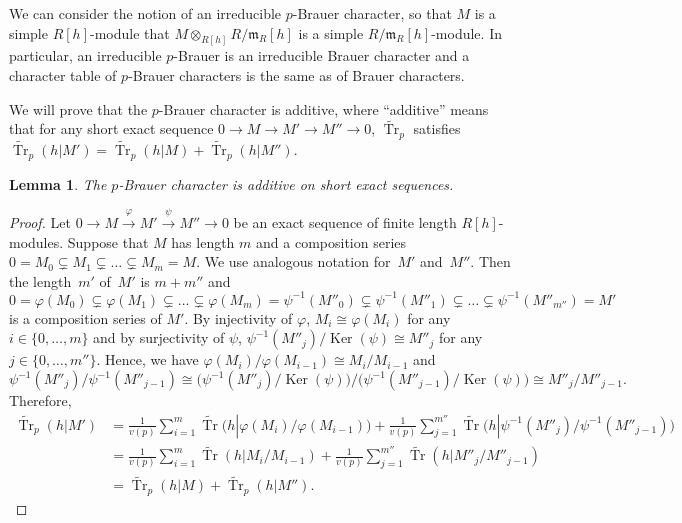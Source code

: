 \documentclass[pdftex]{sigma}%
\numberwithin{equation}{section}
\newtheorem{Lemma}[Theorem]{Lemma}
\begin{document}
We can consider the notion of an irreducible $p$-Brauer character, so that $M$ is a simple $R[h]$-module that $M\otimes_{R[h]} R/\mathfrak{m}_R[h]$ is a simple $R/\mathfrak{m}_R[h]$-module. In particular, an irreducible $p$-Brauer is an irreducible Brauer character and a character table of $p$-Brauer characters is the same as of Brauer characters.

We will prove that the $p$-Brauer character is additive, where ``additive'' means that for any short exact sequence $0\rightarrow M\rightarrow M'\rightarrow M''\rightarrow 0$, $\widetilde{\operatorname{Tr}}_p$ satisfies $\widetilde{\operatorname{Tr}}_p(h|M')=\widetilde{\operatorname{Tr}}_p(h|M)+\widetilde{\operatorname{Tr}}_p(h|M'')$.

\begin{Lemma}\label{additive}
The $p$-Brauer character is additive on short exact sequences.
\end{Lemma}

\begin{proof}
Let $0\rightarrow M\xrightarrow{\varphi} M'\xrightarrow{\psi} M''\rightarrow 0$ be an exact sequence of finite length $R[h]$-modules. Suppose that $M$ has length $m$ and a composition series $0=M_0\subsetneq M_1\subsetneq \dots \subsetneq M_m=M$. We use analogous notation for~$M'$ and~$M''$. Then the length~$m'$ of~$M'$ is $m+m''$ and
\[
0=\varphi(M_0)\subsetneq \varphi(M_1)\subsetneq \dots \subsetneq \varphi(M_m)=\psi^{-1}(M''_0)\subsetneq \psi^{-1}(M''_1)\subsetneq \dots \subsetneq \psi^{-1}(M''_{m''})=M'
\]
 is a composition series of $M'$. By injectivity of $\varphi$, $M_i\cong \varphi(M_i)$ for any $i \in \{0, \dots,m\}$ and by surjectivity of $\psi$, $\psi^{-1}(M''_j)/\operatorname{Ker}(\psi)\cong M''_j$ for any $j \in \{0, \dots,m''\}$. Hence, we have $\varphi(M_i)/\varphi(M_{i-1})\cong M_i/M_{i-1}$ and
\[
\psi^{-1}(M''_j)/\psi^{-1}(M''_{j-1})\cong \big(\psi^{-1}(M''_j)/\operatorname{Ker}(\psi)\big)/\big(\psi^{-1}(M''_{j-1})/\operatorname{Ker}(\psi)\big) \cong M''_j/M''_{j-1}.
\]
 Therefore,
\begin{align*}
\widetilde{\operatorname{Tr}}_p(h|M')&=\frac{1}{v(p)}\sum_{i=1}^m\widetilde{\operatorname{Tr}}\big(h|\varphi(M_i)/\varphi(M_{i-1})\big) +\frac{1}{v(p)}\sum_{j=1}^{m''}\widetilde{\operatorname{Tr}}\big(h|\psi^{-1}(M''_j)/\psi^{-1}(M''_{j-1})\big) \\
 &=\frac{1}{v(p)}\sum_{i=1}^m\widetilde{\operatorname{Tr}}(h|M_i/M_{i-1})+\frac{1}{v(p)}\sum_{j=1}^{m''}\widetilde{\operatorname{Tr}}(h|M''_j/M''_{j-1}) \\
 &=\widetilde{\operatorname{Tr}}_p(h|M)+\widetilde{\operatorname{Tr}}_p(h|M'').\tag*{\qed}
\end{align*}\renewcommand{\qed}{}
\end{proof}
\end{document}
